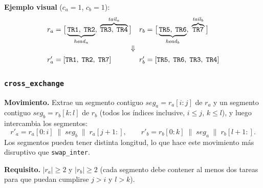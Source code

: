 \noindent\textbf{Ejemplo visual} ($c_a=1$, $c_b=1$):
\[
    \begin{array}{ll}
        r_a = \bigl[\,\underbrace{\mathtt{TR1},\;\mathtt{TR2}}_{\mathit{head}_a},\;
                     \overbrace{\mathtt{TR3},\;\mathtt{TR4}}^{\mathit{tail}_a}\,\bigr]
        &
        r_b = \bigl[\,\underbrace{\mathtt{TR5},\;\mathtt{TR6}}_{\mathit{head}_b},\;
                     \overbrace{\mathtt{TR7}}^{\mathit{tail}_b}\,\bigr] \\[10pt]
        \multicolumn{2}{c}{\Downarrow} \\[4pt]
        r'_a = [\mathtt{TR1},\;\mathtt{TR2},\;\mathtt{TR7}]
        &
        r'_b = [\mathtt{TR5},\;\mathtt{TR6},\;\mathtt{TR3},\;\mathtt{TR4}]
    \end{array}
\]

\subsubsection{\texttt{cross\_exchange}}
\label{sssec:cross-exchange}

\textbf{Movimiento.}
Extrae un segmento contiguo $\mathit{seg}_a = r_a[i{:}j]$ de $r_a$ y un
segmento contiguo $\mathit{seg}_b = r_b[k{:}l]$ de $r_b$ (todos los índices
inclusive, $i \leq j$, $k \leq l$), y luego intercambia los segmentos:
\[
    r'_a = r_a[0{:}i] \;\|\; \mathit{seg}_b \;\|\; r_a[j{+}1{:}],
    \qquad
    r'_b = r_b[0{:}k] \;\|\; \mathit{seg}_a \;\|\; r_b[l{+}1{:}].
\]
Los segmentos pueden tener distinta longitud, lo que hace este movimiento
más disruptivo que \texttt{swap\_inter}.

\textbf{Requisito.} $|r_a| \geq 2$ y $|r_b| \geq 2$ (cada segmento debe
contener al menos dos tareas para que puedan cumplirse $j > i$ y $l > k$).

